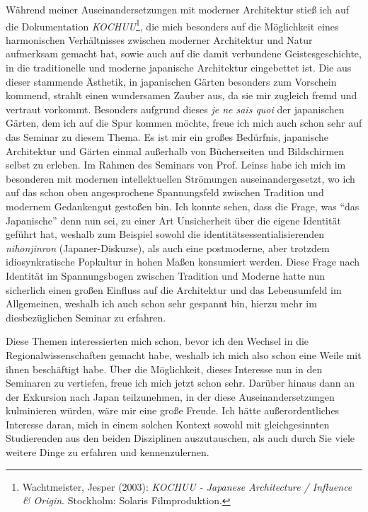 \documentclass[a4paper]{article}
\begin{document}
Während meiner Auseinandersetzungen mit moderner Architektur stieß ich auf die Dokumentation \emph{KOCHUU}\footnote{Wachtmeister, Jesper (2003): \emph{KOCHUU - Japanese Architecture / Influence \& Origin}. Stockholm: Solaris Filmproduktion.}, die mich besonders auf die Möglichkeit eines harmonischen Verhältnisses zwischen moderner Architektur und Natur aufmerksam gemacht hat, sowie auch auf die damit verbundene Geistesgeschichte, in die traditionelle und moderne japanische Architektur eingebettet ist. Die aus dieser stammende Ästhetik, in japanischen Gärten besonders zum Vorschein kommend, strahlt einen wundersamen Zauber aus, da sie mir zugleich fremd und vertraut vorkommt. Besonders aufgrund dieses \emph{je ne sais quoi} der japanischen Gärten, dem ich auf die Spur kommen möchte, freue ich mich auch schon sehr auf das Seminar zu diesem Thema. Es ist mir ein großes Bedürfnis, japanische Architektur und Gärten einmal außerhalb von Bücherseiten und Bildschirmen selbst zu erleben. Im Rahmen des Seminars von Prof. Leinss habe ich mich im besonderen mit modernen intellektuellen Strömungen auseinandergesetzt, wo ich auf das schon oben angesprochene Spannungsfeld zwischen Tradition und modernem Gedankengut gestoßen bin. Ich konnte sehen, dass die Frage, was "`das Japanische"' denn nun sei, zu einer Art Unsicherheit über die eigene Identität geführt hat, weshalb zum Beispiel sowohl die identitätsessentialisierenden \emph{nihonjinron} (Japaner-Diskurse), als auch eine postmoderne, aber trotzdem idiosynkratische Popkultur in hohen Maßen konsumiert werden. Diese Frage nach Identität im Spannungsbogen zwischen Tradition und Moderne hatte nun sicherlich einen großen Einfluss auf die Architektur und das Lebensumfeld im Allgemeinen, weshalb ich auch schon sehr gespannt bin, hierzu mehr im diesbezüglichen Seminar zu erfahren. 

Diese Themen interessierten mich schon, bevor ich den Wechsel in die Regionalwissenschaften gemacht habe, weshalb ich mich also schon eine Weile mit ihnen beschäftigt habe. Über die Möglichkeit, dieses Interesse nun in den Seminaren zu vertiefen, freue ich mich jetzt schon sehr. Darüber hinaus dann an der Exkursion nach Japan teilzunehmen, in der diese Auseinandersetzungen kulminieren würden, wäre mir eine große Freude. Ich hätte außerordentliches Interesse daran, mich in einem solchen Kontext sowohl mit gleichgesinnten Studierenden aus den beiden Disziplinen auszutauschen, als auch durch Sie viele weitere Dinge zu erfahren und kennenzulernen.


\newpage
\printbibliography
\end{document}
